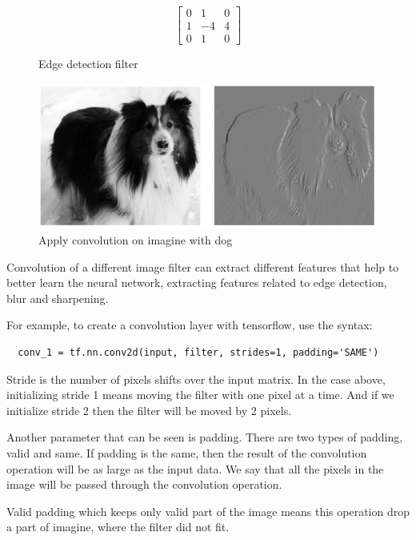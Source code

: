  \begin{figure}[htbp]
  $$\begin{bmatrix}
    0  & 1 & 0 \\
    1  & -4 & 4  \\
    0  & 1 & 0 
\end{bmatrix}$$
  \caption{Edge detection filter}
  \label{fig:edge-detection-filter}
\end{figure}
 \begin{figure}[htbp]
  \centerline{\includegraphics[scale=0.45]{fig/con-dog.PNG}}  
  \caption{Apply convolution on imagine with dog \cite{Mallat:2008:WTS:1525499}}
  \label{fig:exemple-dog-convolution}
\end{figure}
Convolution of a different image filter can extract different features that help to better learn the neural network,
 extracting features related to edge detection, blur and sharpening.

 For example, to create a convolution layer with tensorflow, use the syntax:

 \begin{lstlisting}
  conv_1 = tf.nn.conv2d(input, filter, strides=1, padding='SAME')
 \end{lstlisting}
 Stride is the number of pixels shifts over the input matrix.
 In the case above, initializing stride 1 means moving the filter with one pixel at a time.
 And if we initialize stride 2 then the filter will be moved by 2 pixels.

 Another parameter that can be seen is padding. There are two types of padding, valid and same.
 If padding is the same, then the result of the convolution operation will be as large as the input data.
 We say that all the pixels in the image will be passed through the convolution operation.

 Valid padding which keeps only valid part of the image means 
 this operation drop a part of imagine, where the filter did not fit.

